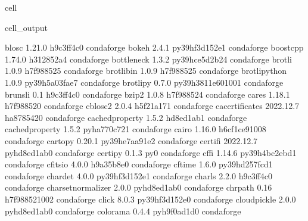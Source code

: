 \documentclass[letterpaper,table,10pt,english]{jupyterBook}
\begin{document}
\begin{sphinxuseclass}{cell}
\begin{sphinxVerbatimOutput}
\begin{sphinxuseclass}{cell_output}
\begin{sphinxVerbatim}[commandchars=\\\{\}]
blosc                     1.21.0               h9c3ff4c\PYGZus{}0    conda\PYGZhy{}forge
bokeh                     2.4.1            py39hf3d152e\PYGZus{}1    conda\PYGZhy{}forge
boost\PYGZhy{}cpp                 1.74.0               h312852a\PYGZus{}4    conda\PYGZhy{}forge
bottleneck                1.3.2            py39hce5d2b2\PYGZus{}4    conda\PYGZhy{}forge
brotli                    1.0.9                h7f98852\PYGZus{}5    conda\PYGZhy{}forge
brotli\PYGZhy{}bin                1.0.9                h7f98852\PYGZus{}5    conda\PYGZhy{}forge
brotli\PYGZhy{}python             1.0.9            py39h5a03fae\PYGZus{}7    conda\PYGZhy{}forge
brotlipy                  0.7.0           py39h3811e60\PYGZus{}1001    conda\PYGZhy{}forge
brunsli                   0.1                  h9c3ff4c\PYGZus{}0    conda\PYGZhy{}forge
bzip2                     1.0.8                h7f98852\PYGZus{}4    conda\PYGZhy{}forge
c\PYGZhy{}ares                    1.18.1               h7f98852\PYGZus{}0    conda\PYGZhy{}forge
c\PYGZhy{}blosc2                  2.0.4                h5f21a17\PYGZus{}1    conda\PYGZhy{}forge
ca\PYGZhy{}certificates           2022.12.7            ha878542\PYGZus{}0    conda\PYGZhy{}forge
cached\PYGZhy{}property           1.5.2                hd8ed1ab\PYGZus{}1    conda\PYGZhy{}forge
cached\PYGZus{}property           1.5.2              pyha770c72\PYGZus{}1    conda\PYGZhy{}forge
cairo                     1.16.0            h6cf1ce9\PYGZus{}1008    conda\PYGZhy{}forge
cartopy                   0.20.1           py39he7aa91e\PYGZus{}2    conda\PYGZhy{}forge
certifi                   2022.12.7          pyhd8ed1ab\PYGZus{}0    conda\PYGZhy{}forge
certipy                   0.1.3                      py\PYGZus{}0    conda\PYGZhy{}forge
cffi                      1.14.6           py39h4bc2ebd\PYGZus{}1    conda\PYGZhy{}forge
cfitsio                   4.0.0                h9a35b8e\PYGZus{}0    conda\PYGZhy{}forge
cftime                    1.6.0            py39hd257fcd\PYGZus{}1    conda\PYGZhy{}forge
chardet                   4.0.0            py39hf3d152e\PYGZus{}1    conda\PYGZhy{}forge
charls                    2.2.0                h9c3ff4c\PYGZus{}0    conda\PYGZhy{}forge
charset\PYGZhy{}normalizer        2.0.0              pyhd8ed1ab\PYGZus{}0    conda\PYGZhy{}forge
chrpath                   0.16              h7f98852\PYGZus{}1002    conda\PYGZhy{}forge
click                     8.0.3            py39hf3d152e\PYGZus{}0    conda\PYGZhy{}forge
cloudpickle               2.0.0              pyhd8ed1ab\PYGZus{}0    conda\PYGZhy{}forge
colorama                  0.4.4              pyh9f0ad1d\PYGZus{}0    conda\PYGZhy{}forge

\end{sphinxVerbatim}
\end{sphinxuseclass}
\end{sphinxVerbatimOutput}
\end{sphinxuseclass}
\end{document}
